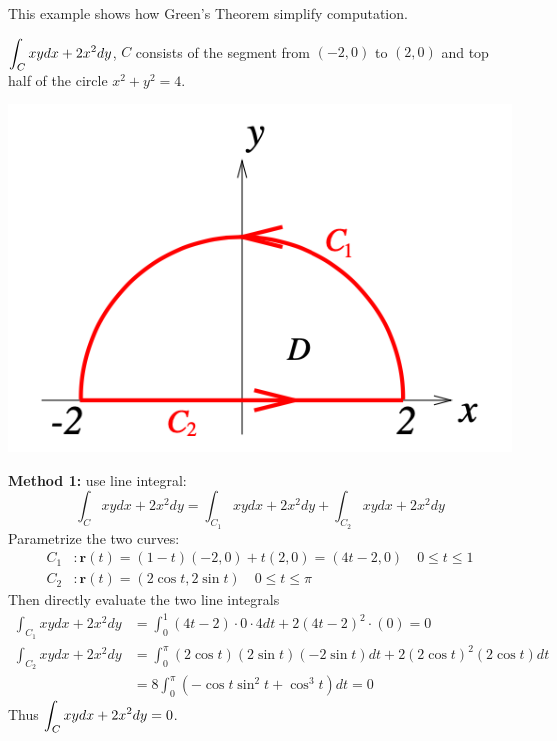 \begin{spacing}{1.3}
    
    
    
    \newpage
    {\blue This example shows how Green's Theorem simplify computation.}

    \eg $\displaystyle \int_{C} x y d x+2 x^{2} d y$, $C$ consists of the segment from $(-2,0)$ to $(2,0)$ and top half of the circle
    $x^2+y^2=4$.
    \begin{center}
        \includegraphics[scale=0.43]{images/Ch16-ex4.2.png}
    \end{center}
    
    \sol 
    
    {\bf Method 1:} use line integral: 
    $$ \int_{C} x y d x+2 x^{2} d y=\int_{C_{1}} x y d x+2 x^{2} d y+\int_{C_{2}} x y d x+2 x^{2} d y$$
    Parametrize the two curves:
    \begin{align*}
        C_{1} &: \mathbf{r}(t)=(1-t)(-2,0)+t(2,0)=(4 t-2,0) \quad 0 \leqslant t \leqslant 1 \\
        C_{2} &: \mathbf{r}(t)=(2 \cos t, 2 \sin t) \quad 0 \leqslant t \leqslant \pi
    \end{align*}
    Then directly evaluate the two line integrals
    \begin{align*}
        \int_{C_{1}} x y d x+2 x^{2} d y &=\int_{0}^{1}(4 t-2) \cdot 0 \cdot 4 d t+2(4 t-2)^{2} \cdot(0)=0 \\
        \int_{C_{2}} x y d x+2 x^{2} d y &=\int_{0}^{\pi}(2 \cos t)(2 \sin t)(-2 \sin t) d t+2(2 \cos t)^{2}(2 \cos t) d t \\
        &=8 \int_{0}^{\pi}\left(-\cos t \sin ^{2} t+\cos ^{3} t\right) d t=0
    \end{align*}
    Thus $\displaystyle \int_{C} x y d x+2 x^{2} d y=0$.
    

\end{spacing}
